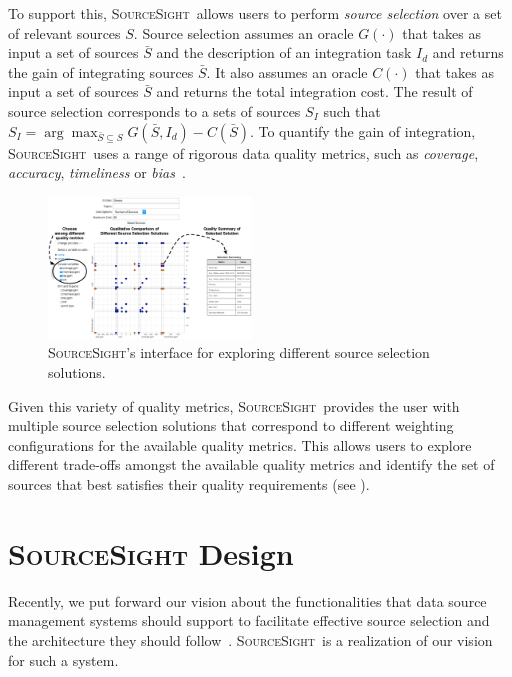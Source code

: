 \documentclass{vldb}
\newcommand\system{\textsc{SourceSight}}
\begin{document}
To support this, \system~allows users to perform {\em source selection} over a set of relevant sources $S$. Source selection assumes an oracle $G(\cdot)$ that takes as input a set of sources $\bar{S}$ and the description of an integration task $I_d$ and returns the gain of integrating sources $\bar{S}$. It also assumes an oracle $C(\cdot)$ that takes as input a set of sources $\bar{S}$ and returns the total integration cost. The result of source selection corresponds to a sets of sources $S_I$ such that $S_I = \arg\max_{\bar{S} \subseteq S}G(\bar{S},I_d) - C(\bar{S})$. To quantify the gain of integration, \system~uses a range of rigorous data quality metrics, such as {\em coverage}, {\em accuracy}, {\em timeliness} or {\em bias}~\cite{dong:vldb13,rekatsinas:2014,rekatsinas:2015}. 

\begin{figure}
	\begin{center}
	\includegraphics[trim=0 0 0 85, clip,width=0.48\textwidth]{fig/ssResults}
	\vspace{-20pt}
	\caption{\system's interface for exploring different source selection solutions.}
	\label{fig:ssresults}
	\end{center}
	\vspace{-22pt}
\end{figure}

Given this variety of quality metrics, \system~provides the user with multiple source selection solutions that correspond to different weighting configurations for the available quality metrics. This allows users to explore different trade-offs amongst the available quality metrics and identify the set of sources that best satisfies their quality requirements (see ).

\section{{\Large \system} Design}
\label{sec:design}
Recently, we put forward our vision about the functionalities that data source management systems should support to facilitate effective source selection and the architecture they should follow~\cite{rekatsinas:2015}. 
\system~is a realization of our vision for such a system. %
\end{document}
